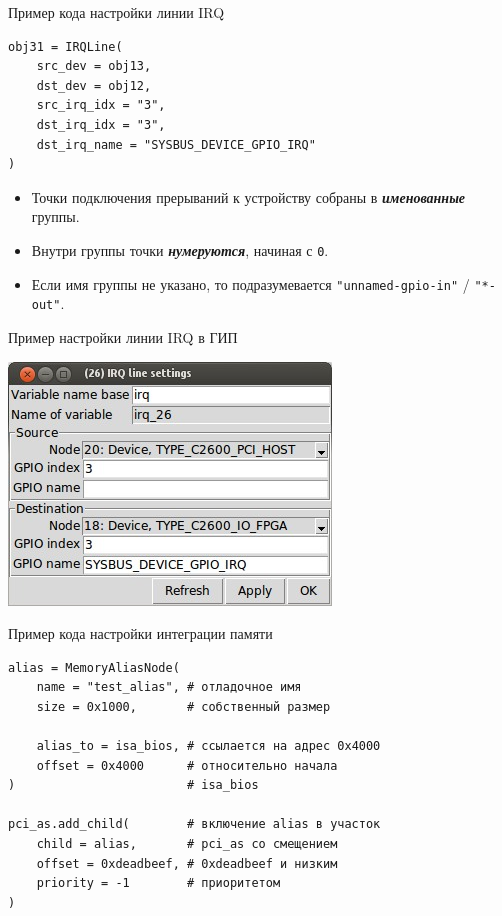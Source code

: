 \documentclass[unicode,hyperref={unicode=true}]{beamer}
\theoremstyle{definition}
\theoremstyle{plain}
\begin{document}
\begin{frame}[fragile]{Пример кода настройки линии IRQ}
\lstset{language=Python}
\begin{lstlisting}
obj31 = IRQLine(
    src_dev = obj13,
    dst_dev = obj12,
    src_irq_idx = "3",
    dst_irq_idx = "3",
    dst_irq_name = "SYSBUS_DEVICE_GPIO_IRQ"
)
\end{lstlisting}
\vfill
\begin{itemize}
\item Точки подключения прерываний к устройству собраны в
\textit{\textbf{именованные}}
группы.
\item Внутри группы точки \textit{\textbf{нумеруются}}, начиная с \texttt{0}.
\item Если имя группы не указано, то подразумевается
\texttt{"unnamed-gpio-in"} / \texttt{"*-out"}.
\end{itemize}
\end{frame}



\begin{frame}{Пример настройки линии IRQ в ГИП}
\begin{center}
\includegraphics[height=0.8\textheight]{irq_widget.jpg}
\end{center}
\end{frame}



\begin{frame}[fragile]{Пример кода настройки интеграции памяти}
\lstset{language=Python}
\begin{lstlisting}
alias = MemoryAliasNode(
    name = "test_alias", # отладочное имя
    size = 0x1000,       # собственный размер

    alias_to = isa_bios, # ссылается на адрес 0x4000
    offset = 0x4000      # относительно начала
)                        # isa_bios

pci_as.add_child(        # включение alias в участок
    child = alias,       # pci_as со смещением
    offset = 0xdeadbeef, # 0xdeadbeef и низким
    priority = -1        # приоритетом
)
\end{lstlisting}
\end{frame}
\end{document}
